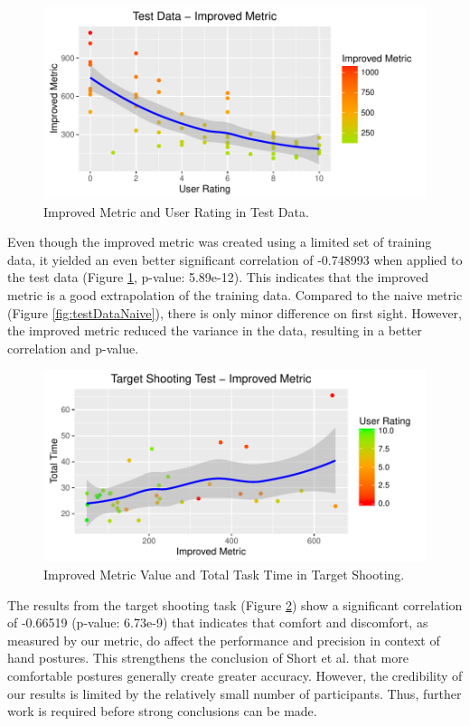\begin{figure}[h]
\centering
\includegraphics[width=\textwidth]{TestDataImproved}
\caption{Improved Metric and User Rating in Test Data.}
\label{fig:testData}
\end{figure}

Even though the improved metric was created using a limited set of training data, it yielded an even better significant correlation of -0.748993 when applied to the test data (Figure \ref{fig:testData}, p-value: 5.89e-12). This indicates that the improved metric is a good extrapolation of the training data. Compared to the naive metric (Figure \ref{fig:testDataNaive}), there is only minor difference on first sight. However, the improved metric reduced the variance in the data, resulting in a better correlation and p-value.

\begin{figure}[h]
\centering
\includegraphics[width=\textwidth]{TargetShooting}
\caption{Improved Metric Value and Total Task Time in Target Shooting.}
\label{fig:targetShooting}
\end{figure}

The results from the target shooting task (Figure \ref{fig:targetShooting}) show a significant correlation of -0.66519 (p-value: 6.73e-9) that indicates that comfort and discomfort, as measured by our metric, do affect the performance and precision in context of hand postures. This strengthens the conclusion of Short et al. \cite{short1999precision} that more comfortable postures generally create greater accuracy. However, the credibility of our results is limited by the relatively small number of participants. Thus, further work is required before strong conclusions can be made.